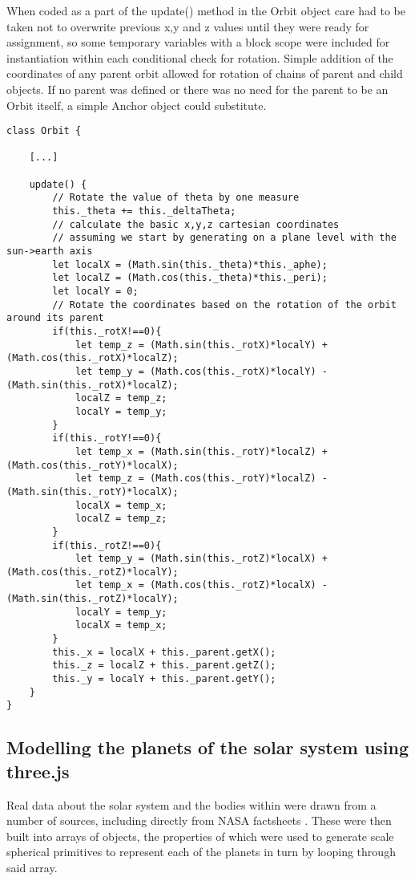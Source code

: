 \documentclass[twoside]{bhamthesis}
\begin{document}
When coded as a part of the update() method in the Orbit object care had to be taken not to overwrite previous x,y and z values until they were ready for assignment, so some temporary variables with a block scope were included for instantiation within each conditional check for rotation. Simple addition of the coordinates of any parent orbit allowed for rotation of chains of parent and child objects. If no parent was defined or there was no need for the parent to be an Orbit itself, a simple Anchor object could substitute.

\newpage

\begin{lstlisting}[label=Implemented code for rotation in 3D space, caption=Implemented code for rotation in 3D space on an update() call, captionpos=b]
class Orbit {

	[...]
	
	update() {
		// Rotate the value of theta by one measure
		this._theta += this._deltaTheta;
		// calculate the basic x,y,z cartesian coordinates
		// assuming we start by generating on a plane level with the sun->earth axis
		let localX = (Math.sin(this._theta)*this._aphe);
		let localZ = (Math.cos(this._theta)*this._peri);
		let localY = 0;
		// Rotate the coordinates based on the rotation of the orbit around its parent
		if(this._rotX!==0){
			let temp_z = (Math.sin(this._rotX)*localY) + (Math.cos(this._rotX)*localZ);
			let temp_y = (Math.cos(this._rotX)*localY) - (Math.sin(this._rotX)*localZ);
			localZ = temp_z;
			localY = temp_y;
		}
		if(this._rotY!==0){
			let temp_x = (Math.sin(this._rotY)*localZ) + (Math.cos(this._rotY)*localX);
			let temp_z = (Math.cos(this._rotY)*localZ) - (Math.sin(this._rotY)*localX);
			localX = temp_x;
			localZ = temp_z;
		}
		if(this._rotZ!==0){
			let temp_y = (Math.sin(this._rotZ)*localX) + (Math.cos(this._rotZ)*localY);
			let temp_x = (Math.cos(this._rotZ)*localX) - (Math.sin(this._rotZ)*localY);
			localY = temp_y;
			localX = temp_x;
		}
		this._x = localX + this._parent.getX();
		this._z = localZ + this._parent.getZ();
		this._y = localY + this._parent.getY();
	}
}
\end{lstlisting}

\newpage

\subsection{Modelling the planets of the solar system using three.js}
Real data about the solar system and the bodies within were drawn from a number of sources, including directly from NASA factsheets \cite{nasa_planetary_2017}. These were then built into arrays of objects, the properties of which were used to generate scale spherical primitives to represent each of the planets in turn by looping through said array.
\end{document}

